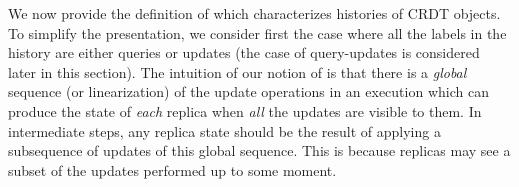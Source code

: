 We now provide the definition of \crdtlin{} which characterizes histories of CRDT objects.
To simplify the presentation, we consider first the case where all the labels in the history are
either queries or updates (the case of query-updates is considered later in this section).
%
%
%
The intuition of our notion of \crdtlin{} is that there is a \emph{global} sequence
(or linearization) of the update operations in an execution which can
produce the state of \emph{each} replica when \emph{all} the updates are visible to them.
In intermediate steps, any replica state should be the result of applying a subsequence of updates
of this global sequence. This is because replicas may see a subset of the updates
performed up to some moment.
